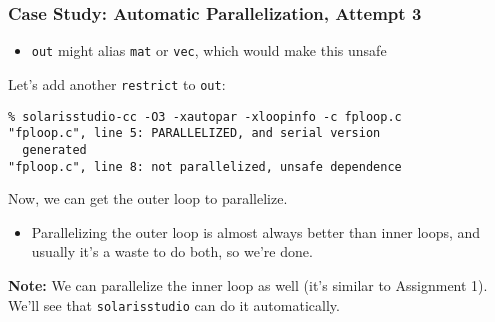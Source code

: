 \begin{frame}[fragile]
  \frametitle{Case Study: Automatic Parallelization, Attempt 3}


  \begin{itemize}
    \item {\tt out} might alias {\tt mat} or {\tt vec}, which would make this
      unsafe
  \end{itemize}

  Let's add another {\tt restrict} to {\tt out}:

  \begin{lstlisting}
% solarisstudio-cc -O3 -xautopar -xloopinfo -c fploop.c
"fploop.c", line 5: PARALLELIZED, and serial version
  generated
"fploop.c", line 8: not parallelized, unsafe dependence
  \end{lstlisting}

  Now, we can get the outer loop to parallelize.
  
  \begin{itemize}
    \item Parallelizing the outer loop is almost always better than inner loops,
      and usually it's a waste to do both, so we're done.
  \end{itemize}

  {\bf Note:} We can parallelize the inner loop as well (it's similar to
  Assignment 1). We'll see that {\tt solarisstudio} can do it automatically.


\end{frame}

